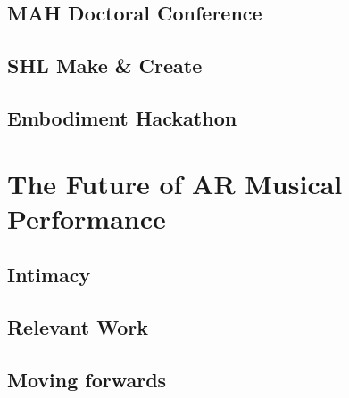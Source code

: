 \subsection{MAH Doctoral Conference} \label{sec: polygons-demonstrations-mah}

\subsection{SHL Make \& Create} \label{sec: polygons-demonstrations-shl}

\subsection{Embodiment Hackathon} \label{sec: 
polygons-demonstrations-emh}



\section{The Future of AR Musical Performance}
\subsection{Intimacy}
\subsection{Relevant Work}
\subsection{Moving forwards}